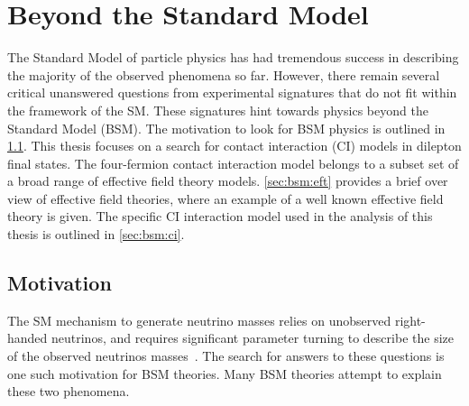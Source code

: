 \chapter{Beyond the Standard Model}\label{chap:bsm}
The Standard Model of particle physics has had tremendous success in describing the majority of the observed phenomena so far. However, there remain several critical unanswered questions from experimental signatures that do not fit within the framework of the SM. These signatures hint towards physics beyond the Standard Model (BSM). The motivation to look for BSM physics is outlined in \cref{sec:bsm:motivation}. This thesis focuses on a search for contact interaction (CI) models in dilepton final states. The four-fermion contact interaction model belongs to a subset set of a broad range of effective field theory models. \cref{sec:bsm:eft} provides a brief over view of effective field theories, where an example of a well known effective field theory is given. The specific CI interaction model used in the analysis of this thesis is outlined in \cref{sec:bsm:ci}.

\section{Motivation}\label{sec:bsm:motivation}

The SM mechanism to generate neutrino masses relies on unobserved right-handed neutrinos, and requires significant parameter turning to describe the size of the observed neutrinos masses~\cite{Fukuda_1998}. The search for answers to these questions is one such motivation for BSM theories. Many BSM theories attempt to explain these two phenomena. 


